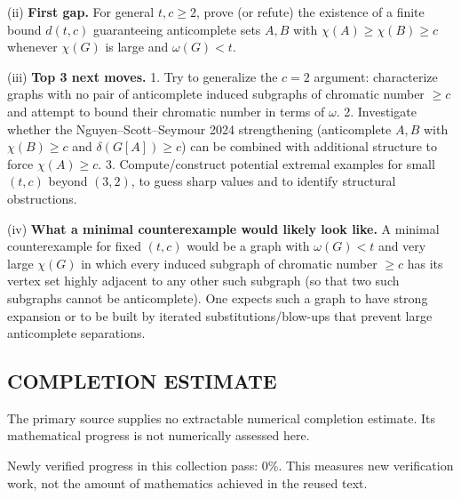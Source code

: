 (ii) \textbf{First gap.}
For general $t,c\ge 2$, prove (or refute) the existence of a finite bound $d(t,c)$ guaranteeing anticomplete sets $A,B$ with $\chi(A)\ge \chi(B)\ge c$ whenever $\chi(G)$ is large and $\omega(G)<t$.

(iii) \textbf{Top 3 next moves.}
1. Try to generalize the $c=2$ argument: characterize graphs with no pair of anticomplete induced subgraphs of chromatic number $\ge c$ and attempt to bound their chromatic number in terms of $\omega$.
2. Investigate whether the Nguyen--Scott--Seymour 2024 strengthening (anticomplete $A,B$ with $\chi(B)\ge c$ and $\delta(G[A])\ge c$) can be combined with additional structure to force $\chi(A)\ge c$.
3. Compute/construct potential extremal examples for small $(t,c)$ beyond $(3,2)$, to guess sharp values and to identify structural obstructions.

(iv) \textbf{What a minimal counterexample would likely look like.}
A minimal counterexample for fixed $(t,c)$ would be a graph with $\omega(G)<t$ and very large $\chi(G)$ in which every induced subgraph of chromatic number $\ge c$ has its vertex set highly adjacent to any other such subgraph (so that two such subgraphs cannot be anticomplete). One expects such a graph to have strong expansion or to be built by iterated substitutions/blow-ups that prevent large anticomplete separations.



\subsection*{COMPLETION ESTIMATE}
The primary source supplies no extractable numerical completion estimate. Its mathematical progress is not numerically assessed here.

Newly verified progress in this collection pass: $0\%$. This measures new verification work, not the amount of mathematics achieved in the reused text.
